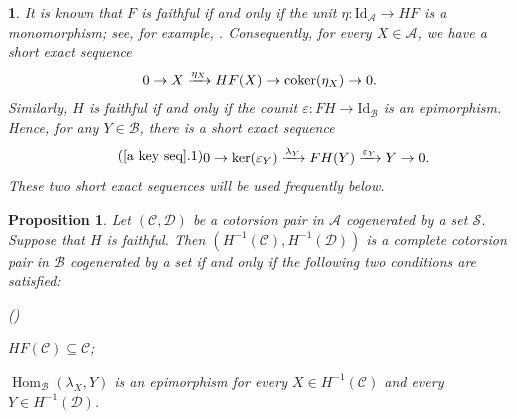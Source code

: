 \documentclass[12pt,twoside]{amsart}
\theoremstyle{bfupright head,slanted body}
\theoremstyle{bfupright head,upright body}
\theoremstyle{fixed bf head,slanted body}
\newtheorem{prp}[res]{Proposition}      \newtheorem*{prp*}{Proposition}
\theoremstyle{fixed bf head,upright body}
\theoremstyle{numbered paragraph}
\newtheorem{ipg}[res]{}
\newlength{\thmlistleft}        %
\newlength{\thmlistright}       %
\newlength{\thmlistpartopsep}   %
\newlength{\thmlisttopsep}      %
\newlength{\thmlistparsep}      %
\newlength{\thmlistitemsep}     %
\newcounter{prt}
\newenvironment{prt}{\begin{list}{\upshape (\alph{prt})}%
    {\usecounter{prt}%
      \setlength{\leftmargin}{\thmlistleft}%
      \setlength{\labelwidth}{\thmlistleft}%
      \setlength{\rightmargin}{\thmlistright}%
      \setlength{\partopsep}{\thmlistpartopsep}%
      \setlength{\topsep}{\thmlisttopsep}%
      \setlength{\parsep}{\thmlistparsep}%
      \setlength{\itemsep}{\thmlistitemsep}}}%
  {\end{list}}%
\newcommand{\lemcite}[2][?]{\cite[Lemma~#1]{#2}}
\numberwithin{equation}{res}
\newcommand{\coker}{\mbox{\rm coker}}
\newcommand{\calC}{\mathcal{C}}
\newcommand{\calA}{\mathcal{A}}
\newcommand{\calB}{\mathcal{B}}
\newcommand{\calD}{\mathcal{D}}
\newcommand{\calS}{\mathcal{S}}
\newcommand{\Id}{\mathrm{Id}}
\newcommand{\Hom}{\operatorname{Hom}}
\begin{document}
\begin{ipg} \label{a key seq}
It is known that \(F\) is faithful if and only if the unit \(\eta:\Id_{\calA}\to HF\) is a monomorphism; see, for example, \lemcite[2.1(3)]{2022CR}.
Consequently, for every \(X\in\calA\), we have a short exact sequence
\begin{equation*} \label{key ses mono}
\begin{gathered}
0 \to X \xrightarrow{\eta_X} HF(X) \to \coker(\eta_X) \to 0.
\end{gathered}
\end{equation*}
Similarly, \(H\) is faithful if and only if the counit \(\varepsilon:FH\to\Id_{\calB}\) is an epimorphism.
Hence, for any \(Y\in\calB\), there is a short exact sequence
\begin{equation*} \label{key ses} \tag{\ref{a key seq}.1}
\begin{gathered}
0 \to \ker(\varepsilon_Y) \xrightarrow{\lambda_Y} FH(Y)
      \xrightarrow{\varepsilon_Y} Y \to 0.
\end{gathered}
\end{equation*}
These two short exact sequences will be used frequently below.
\end{ipg}

\begin{prp} \label{C_H=D_H}
Let \((\calC,\calD)\) be a cotorsion pair in \(\calA\) cogenerated by a set \(\calS\).
Suppose that \(H\) is faithful.
Then \((H^{-1}(\mathcal C), H^{-1}(\mathcal D))\) is a complete cotorsion pair in \(\calB\) cogenerated by a set if and only if the following two conditions are satisfied:
\begin{prt}
\item \(HF(\calC)\subseteq\calC\);
\item \(\Hom_\calB(\lambda_X,Y)\) is an epimorphism for every \(X\in H^{-1}(\mathcal C)\) and every \(Y\in H^{-1}(\mathcal D)\).
\end{prt}
\end{prp}
\end{document}
